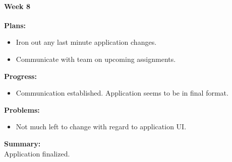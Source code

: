 \paragraph{Week 8}
\begin{adjustwidth}{2.5em}{0pt}
    \vspace{-0.5cm}\textbf{Plans:}
    \vspace{-0.5cm}
    \begin{itemize}
        \item Iron out any last minute application changes. 
		\item Communicate with team on upcoming assignments. 
    \end{itemize} 
    \vspace{-0.3cm}\textbf{Progress:}
    \vspace{-0.5cm}
    \begin{itemize}
        \item Communication established. Application seems to be in final format.
    \end{itemize} 
    \vspace{-0.3cm}\textbf{Problems:}
    \vspace{-0.5cm}
    \begin{itemize}
        \item Not much left to change with regard to application UI.

    \end{itemize}  
    \vspace{-0.3cm}\noindent\textbf{Summary:}\\
    \noindent Application finalized. 
\end{adjustwidth} 
